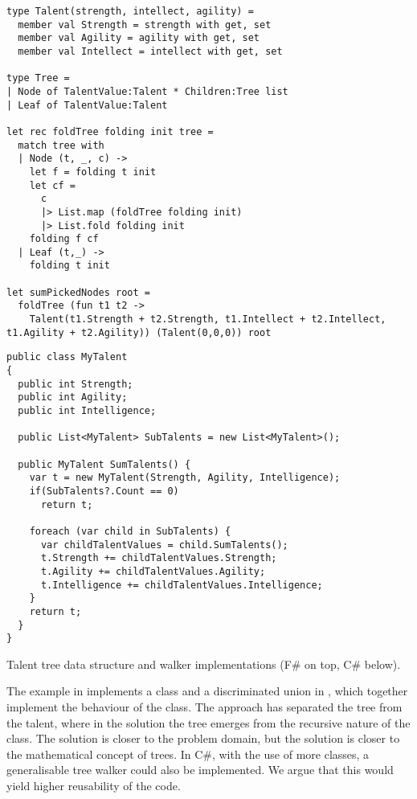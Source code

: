 \begin{listing}[H]
  \begin{verbatim}
type Talent(strength, intellect, agility) =
  member val Strength = strength with get, set
  member val Agility = agility with get, set
  member val Intellect = intellect with get, set

type Tree =
| Node of TalentValue:Talent * Children:Tree list
| Leaf of TalentValue:Talent

let rec foldTree folding init tree =
  match tree with
  | Node (t, _, c) ->
    let f = folding t init
    let cf =
      c
      |> List.map (foldTree folding init)
      |> List.fold folding init
    folding f cf
  | Leaf (t,_) ->
    folding t init

let sumPickedNodes root =
  foldTree (fun t1 t2 ->
    Talent(t1.Strength + t2.Strength, t1.Intellect + t2.Intellect, t1.Agility + t2.Agility)) (Talent(0,0,0)) root
  \end{verbatim}
  \begin{verbatim}
public class MyTalent
{
  public int Strength;
  public int Agility;
  public int Intelligence;

  public List<MyTalent> SubTalents = new List<MyTalent>();

  public MyTalent SumTalents() {
    var t = new MyTalent(Strength, Agility, Intelligence);
    if(SubTalents?.Count == 0)
      return t;

    foreach (var child in SubTalents) {
      var childTalentValues = child.SumTalents();
      t.Strength += childTalentValues.Strength;
      t.Agility += childTalentValues.Agility;
      t.Intelligence += childTalentValues.Intelligence;
    }
    return t;
  }
}
  \end{verbatim}
  \caption{Talent tree data structure and walker implementations (F\# on top, C\# below).}
  \label{lst:tree-imps}
\end{listing}

The example in  implements a class and a discriminated union in \fs, which together implement the behaviour of the \cs class. The \fs approach has separated the tree from the talent, where in the  \cs solution the tree emerges from the recursive nature of the class. The \cs solution is closer to the problem domain, but the \fs solution is closer to the mathematical concept of trees. In C\#, with the use of more classes, a generalisable tree walker could also be implemented. We argue that this would yield higher reusability of the code.
